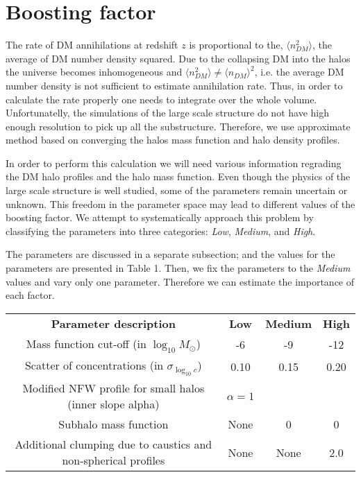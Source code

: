 \section{Boosting factor}
\label{sec:boosting}

The rate of DM annihilations at redshift $z$ is proportional to the, $\langle n_{DM}^2 \rangle$, the average of DM number density squared. Due to the collapsing DM into the halos the universe becomes inhomogeneous and $\langle n_{DM}^2 \rangle \neq \langle n_{DM} \rangle ^2$, i.e. the average DM number density is not sufficient to estimate annihilation rate. Thus, in order to calculate the rate properly one needs to integrate over the whole volume. Unfortunatelly, the simulations of the large scale structure do not have high enough resolution to pick up all the substructure. Therefore, we use approximate method based on converging the halos mass function and halo density profiles.

In order to perform this calculation we will need various information regrading the DM halo profiles and the halo mass function. Even though the physics of the large scale structure is well studied, some of the parameters remain uncertain or unknown. This freedom in the parameter space may lead to different values of the boosting factor. We attempt to systematically approach this problem by classifying the parameters into three categories: \textit{Low}, \textit{Medium}, and \textit{High}. 

The parameters are discussed in a separate subsection; and the values for the parameters are presented in Table 1. Then, we fix the parameters to the \textit{Medium} values and vary only one parameter. Therefore we can estimate the importance of each factor.

\begin{table}
    \begin{tabular}{ c c c c }
    \textbf{Parameter description}                                    & \textbf{Low} & \textbf{Medium} & \textbf{High} \hline \hline \\
    Mass function cut-off (in $\log_{10}M_\odot$)        & -6 & -9 & -12 \\
    Scatter of concentrations (in $\sigma_{\log_{10}c}$)              & 0.10 & 0.15 & 0.20 \\
    Modified NFW profile for small halos (inner slope alpha) & $\alpha=1$ & \cite{Ishiyama_2014} &  \cite{Ishiyama_2014} \\
    Subhalo mass function & None & 0 & 0 \\
    Additional clumping due to caustics and non-spherical profiles & None & None & 2.0
\\    \end{tabular}
\end{table}
